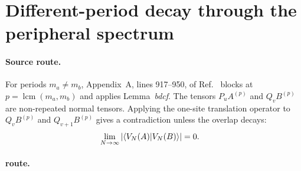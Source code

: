 \documentclass{article}
\begin{document}
\section{Different-period decay through the peripheral spectrum}

\paragraph{Source route.}

For periods $m_a\neq m_b$, Appendix~A, lines 917--950, of
Ref.~\cite{DeLasCuevas2017Irreducible} blocks at
$p=\operatorname{lcm}(m_a,m_b)$ and applies Lemma~\emph{bdcf}. The tensors
$P_uA^{(p)}$ and $Q_vB^{(p)}$ are non-repeated normal tensors. Applying the
one-site translation operator to $Q_vB^{(p)}$ and $Q_{v+1}B^{(p)}$ gives a
contradiction unless the overlap decays:
\begin{align}
    \lim_{N\to\infty}
    \left|\langle V_N(A) | V_N(B) \rangle\right|
    &=0.
    \label{eq:dccsp17_periodic_overlap_route_alignment_different_period_decay}
\end{align}

\paragraph{\Lean{} route.}
\end{document}

